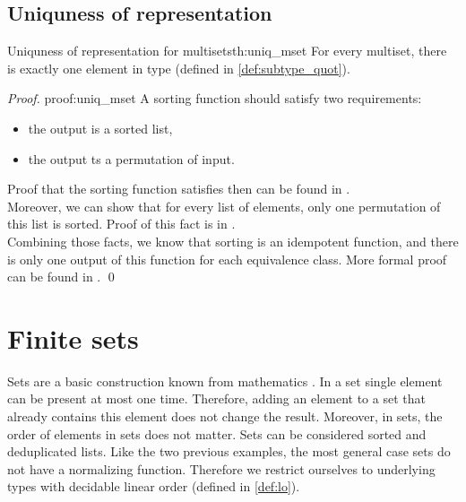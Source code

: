 \subsection{Uniquness of representation}
\begin{theo}{Uniquness of representation for multisets}{th:uniq_mset}
For every multiset, there is exactly one element in  type (defined in \ref{def:subtype_quot}). 
\end{theo}
\begin{proof}{}{proof:uniq_mset}
A sorting function should satisfy two requirements:
\begin{itemize}
    \itemsep 0em 
    \item the output is a sorted list,
    \item the output ts a permutation of input.
\end{itemize}
Proof that the sorting function satisfies then can be found in .\\
Moreover, we can show that for every list of elements, only one permutation of this list is sorted. Proof of this fact is in .\\
Combining those facts, we know that sorting is an idempotent function, and there is only one output of this function for each equivalence class. More formal proof can be found in . \qed
\end{proof}
\section{Finite sets}
Sets are a basic construction known from mathematics \cite{SetTheorey}. In a set single element can be present at most one time. Therefore, adding an element to a set that already contains this element does not change the result. Moreover, in sets, the order of elements in sets does not matter. Sets can be considered sorted and deduplicated lists. Like the two previous examples, the most general case sets do not have a normalizing function. Therefore we restrict ourselves to underlying types with decidable linear order (defined in \ref{def:lo}).

